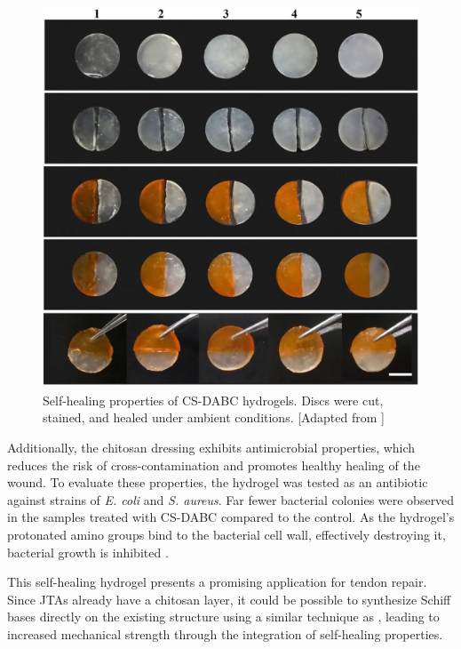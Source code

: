 \begin{figure}[ht]
    \centering 
    \includegraphics[width=\linewidth]{Figures/CS_DABC_self_healing.jpg}
    \caption{Self-healing properties of CS-DABC hydrogels. Discs were cut, stained, and healed under ambient conditions. [Adapted from \cite{liAllnaturalInjectableHydrogel2020}]}
    \label{fig:CS_DABC_self_healing}
\end{figure}

Additionally, the chitosan dressing exhibits antimicrobial properties, which reduces the risk of cross-contamination and promotes healthy healing of the wound. To evaluate these properties, the hydrogel was tested as an antibiotic against strains of \textit{E. coli} and \textit{S. aureus}.
Far fewer bacterial colonies were observed in the samples treated with CS-DABC compared to the control. As the hydrogel's protonated amino groups bind to the bacterial cell wall, effectively destroying it, bacterial growth is inhibited \autocite{liAllnaturalInjectableHydrogel2020}.

This self-healing hydrogel presents a promising application for tendon repair. Since JTAs already have a chitosan layer, it could be possible to synthesize Schiff bases directly on the existing structure using a similar technique as \citeauthor{liAllnaturalInjectableHydrogel2020}, leading to increased mechanical strength through the integration of self-healing properties.
